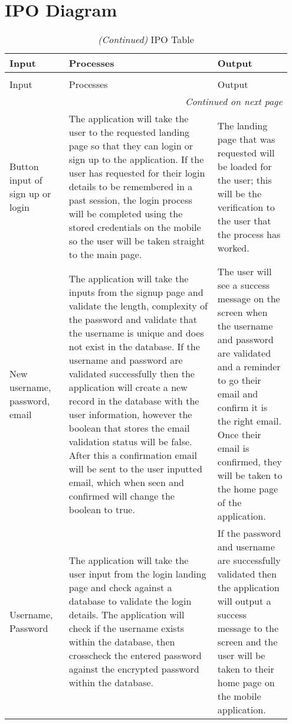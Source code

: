 
\let\textcircled=\pgftextcircled
\chapter{IPO Diagram}

\begin{longtable}{ |p{0.2\linewidth}|p{0.5\linewidth}|p{0.25\linewidth}|}
\caption{IPO Table} \\
\hline
 \textbf{Input} & \textbf{Processes} & \textbf{Output}\\
\hline
\endfirsthead
\caption{\textit{(Continued)} IPO Table}\\
\hline
Input & Processes & Output \\
\hline
\endhead
\hline
\hline
\hline
\multicolumn{3}{r}{\textit{Continued on next page}} \\
\endfoot
\endlastfoot
 Button input of sign up or login & The application will take the user to the requested landing page so that they can login or sign up to the application. If the user has requested for their login details to be remembered in a past session, the login process will be completed using the stored credentials on the mobile so the user will be taken straight to the main page. & The landing page that was requested will be loaded for the user; this will be the verification to the user that the process has worked. \\
 \hline
New username, password, email & The application will take the inputs from the signup page and validate the length, complexity of the password and validate that the username is unique and does not exist in the database. If the username and password are validated successfully then the application will create a new record in the database with the user information, however the boolean that stores the email validation status will be false. After this a confirmation email will be sent to the user inputted email, which when seen and confirmed will change the boolean to true. & The user will see a success message on the screen when the username and password are validated and a reminder to go their email and confirm it is the right email. Once their email is confirmed, they will be taken to the home page of the application. \\
\hline
Username, Password & The application will take the user input from the login landing page and check against a database to validate the login details. The application will check if the username exists within the database, then crosscheck the entered password against the encrypted password within the database. & If the password and username are successfully validated then the application will output a success message to the screen and the user will be taken to their home page on the mobile application. \\

\end{longtable}
